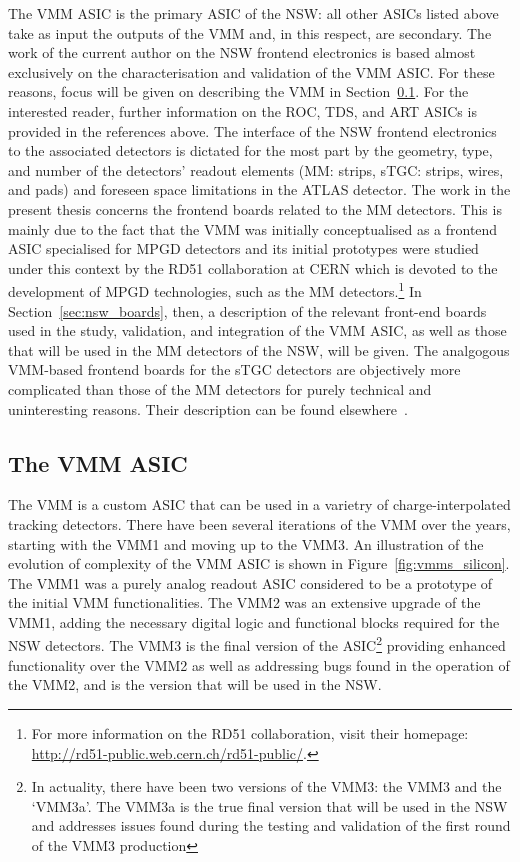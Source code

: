 The VMM ASIC is the primary ASIC of the NSW: all other ASICs listed above take as input
the outputs of the VMM and, in this respect, are secondary.
The work of the current author on the NSW frontend electronics is based almost exclusively
on the characterisation and validation of the VMM ASIC.
For these reasons, focus will be given on describing the VMM in Section~\ref{sec:vmm}.
For the interested reader, further information on the ROC, TDS, and ART ASICs is
provided in the references above.
The interface of the NSW frontend electronics to the associated detectors is dictated for the most part
by the geometry, type, and number of the detectors' readout elements (MM: strips, sTGC: strips, wires, and pads)
and foreseen space limitations in the ATLAS detector.
The work in the present thesis concerns the frontend boards related to the MM detectors.
This is mainly due to the fact that the VMM was initially conceptualised as a frontend ASIC specialised
for MPGD detectors and its initial prototypes were studied under this context by the RD51 collaboration
at CERN which is devoted to the development of MPGD technologies, such as the MM detectors.\footnote{For more information
on the RD51 collaboration, visit their homepage: \url{http://rd51-public.web.cern.ch/rd51-public/}.}
In Section~\ref{sec:nsw_boards}, then, a description of the relevant front-end boards used in the
study, validation, and integration of the VMM ASIC, as well as those that will be used in
the MM detectors of the NSW, will be given.
The analgogous VMM-based frontend boards for the sTGC detectors are objectively more complicated than those
of the MM detectors for purely technical and uninteresting reasons.
Their description can be found elsewhere~\cite{NSWTDR}.

\subsection{The VMM ASIC}
\label{sec:vmm}

The VMM is a custom ASIC that can be used in a varietry of charge-interpolated tracking
detectors.
There have been several iterations of the VMM over the years, starting with the VMM1 and
moving up to the VMM3.
An illustration of the evolution of complexity of the VMM ASIC is shown in Figure~\ref{fig:vmms_silicon}.
The VMM1 was a purely analog readout ASIC considered to be a prototype of the initial VMM functionalities.
The VMM2 was an extensive upgrade of the VMM1, adding the necessary digital logic and functional blocks
required for the NSW detectors.
The VMM3 is the final version of the ASIC\footnote{In actuality, there have been two versions of the
VMM3: the VMM3 and the `VMM3a'. The VMM3a is the true final version that will be used in the NSW
and addresses issues found during the testing and validation of the first round of the VMM3 production}
providing enhanced functionality over the VMM2
as well as addressing bugs found in the operation of the VMM2, and is the version that will be used
in the NSW.

